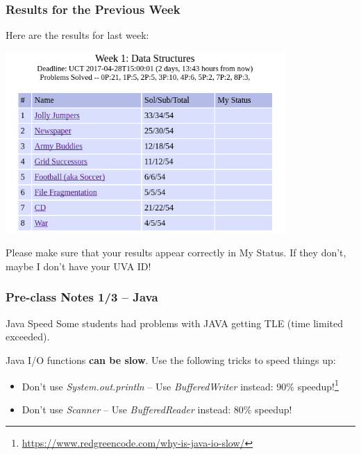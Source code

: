 \begin{frame}
  \frametitle{Results for the Previous Week}

  \begin{center}
    Here are the results for last week:

    \bigskip
    
    \includegraphics[width=0.8\textwidth]{img/resultsW1}

    \bigskip

    Please make sure that your results appear correctly in My
    Status. If they don't, maybe I don't have your UVA ID!
  \end{center}
\end{frame}

\begin{frame}[fragile]
  \frametitle{Pre-class Notes 1/3 -- Java}

  \begin{block}{Java Speed}
    Some students had problems with JAVA getting TLE (time limited
    exceeded).

    \bigskip

    Java I/O functions {\bf can be slow}. Use the following tricks to
    speed things up:
  \end{block}

  \begin{itemize}
  \item Don't use \emph{System.out.println} -- Use
    \emph{BufferedWriter} instead: 90\%
    speedup!\footnote{\url{https://www.redgreencode.com/why-is-java-io-slow/}}
  \item Don't use \emph{Scanner} -- Use \emph{BufferedReader} instead: 80\% speedup!
  \end{itemize}
\end{frame}

